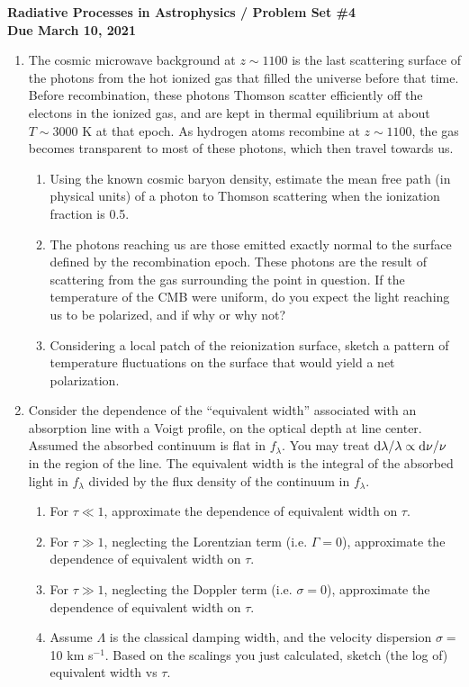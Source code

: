 \documentclass[11pt, preprint]{article}
\begin{document}
\begin{center}
  {\bf Radiative Processes in Astrophysics / Problem Set \#4 \\
    Due March 10, 2021}
\end{center}

\begin{enumerate}
\item The cosmic microwave background at $z\sim 1100$ is the last
  scattering surface of the photons from the hot ionized gas that
  filled the universe before that time. Before recombination, these
  photons Thomson scatter efficiently off the electons in the ionized
  gas, and are kept in thermal equilibrium at about $T\sim 3000$ K at
  that epoch. As hydrogen atoms recombine at $z\sim 1100$, the gas
  becomes transparent to most of these photons, which then travel
  towards us.
\begin{enumerate}
\item Using the known cosmic baryon density, estimate the mean free
  path (in physical units) of a photon to Thomson scattering when the
  ionization fraction is 0.5.
\item The photons reaching us are those emitted exactly normal to the
  surface defined by the recombination epoch. These photons are the
  result of scattering from the gas surrounding the point in
  question. If the temperature of the CMB were uniform, do you expect
  the light reaching us to be polarized, and if why or why not?
\item Considering a local patch of the reionization surface, sketch a
  pattern of temperature fluctuations on the surface that would yield
  a net polarization.
\end{enumerate}

\item Consider the dependence of the ``equivalent width'' associated
  with an absorption line with a Voigt profile, on the optical depth
  at line center. Assumed the absorbed continuum is flat in
  $f_\lambda$. You may treat ${\rm d}\lambda/\lambda \propto {\rm
    d}\nu/\nu$ in the region of the line. The equivalent width is the
  integral of the absorbed light in $f_\lambda$ divided by the flux
  density of the continuum in $f_\lambda$.
  \begin{enumerate}
    \item For $\tau\ll 1$, approximate the dependence of equivalent
      width on $\tau$. 
    \item For $\tau\gg 1$, neglecting the Lorentzian term
      (i.e. $\Gamma = 0$), approximate the dependence of equivalent
      width on $\tau$.
    \item For $\tau\gg 1$, neglecting the Doppler term
      (i.e. $\sigma = 0$), approximate the dependence of equivalent
      width on $\tau$.
    \item Assume $\Lambda$ is the classical damping width, and the
      velocity dispersion $\sigma =$ 10 km s$^{-1}$. Based on the
      scalings you just calculated, sketch (the log of) equivalent
      width vs $\tau$.
  \end{enumerate}
  
\end{enumerate}
\end{document}
